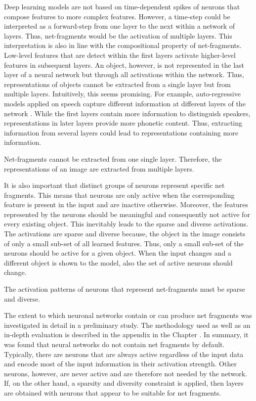 Deep learning models are not based on time-dependent spikes of neurons that compose features to more complex features.
However, a time-step could be interpreted as a forward-step from one layer to the next within a network of layers.
Thus, net-fragments would be the activation of multiple layers.
This interpretation is also in line with the compositional property of net-fragments.
Low-level features that are detect within the first layers activate higher-level features in subsequent layers.
An object, however, is not represented in the last layer of a neural network but through all activations within the network.
Thus, representations of objects cannot be extracted from a single layer but from multiple layers.
Intuitively, this seems promising.
For example, auto-regressive models applied on speech capture different information at different layers of the network .
While the first layers contain more information to distinguish speakers, representations in later layers provide more phonetic content.
Thus, extracting information from several layers could lead to representations containing more information.

\begin{implementation}
	Net-fragments cannot be extracted from one single layer. Therefore, the representations of an image are extracted from multiple layers.
\end{implementation}


It is also important that distinct groups of neurons represent specific net fragments.
This means that neurons are only active when the corresponding feature is present in the input and are inactive otherwise.
Moreover, the features represented by the neurons should be meaningful and consequently not active for every existing object.
This inevitably leads to the sparse and diverse activations.
The activations are sparse and diverse because, the object in the image consists of only a small sub-set of all learned features. Thus, only a small sub-set of the neurons should be active for a given object.
When the input changes and a different object is shown to the model, also the set of active neurons should change.

\begin{claim}
	The activation patterns of neurons that represent net-fragments must be sparse and diverse.
\end{claim}

The extent to which neuronal networks contain or can produce net fragments was investigated in detail in a preliminary study.
The methodology used as well as an in-depth evaluation is described in the appendix in the Chapter .
In summary, it was found that neural networks do not contain net fragments by default. Typically, there are neurons that are always active regardless of the input data and encode most of the input information in their activation strength.
Other neurons, however, are never active and are therefore not needed by the network.
If, on the other hand, a sparsity and diversity constraint is applied, then layers are obtained with neurons that appear to be suitable for net fragments.

